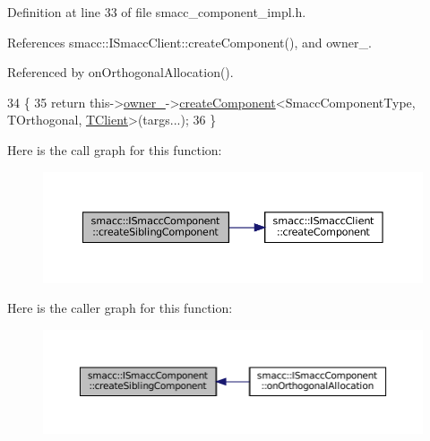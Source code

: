 Definition at line 33 of file smacc\+\_\+component\+\_\+impl.\+h.



References smacc\+::\+I\+Smacc\+Client\+::create\+Component(), and owner\+\_\+.



Referenced by on\+Orthogonal\+Allocation().


\begin{DoxyCode}
34     \{
35         \textcolor{keywordflow}{return} this->\hyperlink{classsmacc_1_1ISmaccComponent_a909590e672450ce0eb0d8facb45c737a}{owner\_}->\hyperlink{classsmacc_1_1ISmaccClient_a5c1c8eb5e91a3b399662a52cb0ca86aa}{createComponent}<SmaccComponentType, TOrthogonal, 
      \hyperlink{classTClient}{TClient}>(targs...);
36     \}
\end{DoxyCode}
Here is the call graph for this function\+:
\nopagebreak
\begin{figure}[H]
\begin{center}
\leavevmode
\includegraphics[width=350pt]{classsmacc_1_1ISmaccComponent_a85a3f70369d18176aa0a28c3ba31b945_cgraph}
\end{center}
\end{figure}
Here is the caller graph for this function\+:
\nopagebreak
\begin{figure}[H]
\begin{center}
\leavevmode
\includegraphics[width=350pt]{classsmacc_1_1ISmaccComponent_a85a3f70369d18176aa0a28c3ba31b945_icgraph}
\end{center}
\end{figure}
\mbox{\label{classsmacc_1_1ISmaccComponent_a86afd97c9eaed89073def7c51a3c86ab}} 
